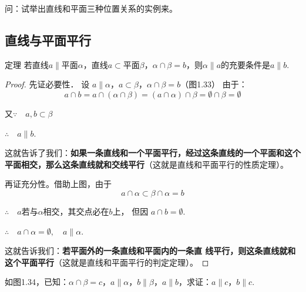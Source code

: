 问：试举出直线和平面三种位置关系的实例来。

\subsection{直线与平面平行}
\begin{blk}
  {定理}
  若直线$a\parallel$平面$\alpha$，直线$a\subset$平面$\beta$，$\alpha\cap \beta=b$，则$\alpha\parallel a$的充要条件是$a\parallel b$.
\end{blk}

\begin{proof}
先证必要性．
设 $a\parallel\alpha$，$a\subset \beta$，$\alpha\cap\beta=b$（图1.33）
由于：
\[a\cap b=a\cap(\alpha\cap \beta)=(a\cap\alpha)\cap \beta=\emptyset\cap\beta=\emptyset\]

又$\because\quad a,b\subset\beta$

$\therefore\quad  a\parallel b$.

这就告诉了我们：\textbf{如果一条直线和一个平面平行，经过这条直线的一个平面和这个平面相交，那么这条直线就和交线平行}（这就是直线和平面平行的性质定理）。

\begin{figure}[htp]
  \centering
{}
  \caption{}
\end{figure}

再证充分性。借助上图，由于
\[a\cap\alpha\subset \beta\cap\alpha=b\]

$\therefore\quad a$若与$\alpha$相交，其交点必在$b$上，
但因 $a\cap b=\emptyset$.

$\therefore\quad a\cap\alpha=\emptyset,\quad a\parallel\alpha$.

这就告诉我们：\textbf{若平面外的一条直线和平面内的一条直
线平行，则这条直线就和这个平面平行}（这就是直线和平面平行的判定定理）。
\end{proof}


\begin{example}
  如图1.34，已知：$\alpha\cap\beta=c$，$a\parallel \alpha$，$b\parallel \beta$，$a\parallel b$，求证：$a\parallel c$，$b\parallel c$.
\end{example}

